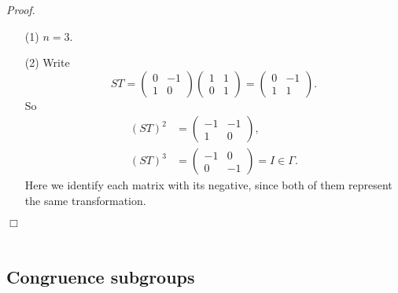 \documentclass{article}
\begin{document}
\emph{Proof.}
\begin{enumerate}
\item[(1)]
  $n = 3$.

\item[(2)]
  Write
  \[
    ST
    =
    \begin{pmatrix}
      0 & -1 \\
      1 & 0
    \end{pmatrix}
    \begin{pmatrix}
      1 & 1 \\
      0 & 1
    \end{pmatrix}
    =
    \begin{pmatrix}
      0 & -1 \\
      1 & 1
    \end{pmatrix}.
  \]
  So
  \begin{align*}
    (ST)^2
    &=
    \begin{pmatrix}
      -1 & -1 \\
      1 & 0
    \end{pmatrix}, \\
    (ST)^3
    &=
    \begin{pmatrix}
      -1 & 0 \\
      0 & -1
    \end{pmatrix} = I \in \Gamma.
  \end{align*}
  Here we identify each matrix with its negative,
  since both of them represent the same transformation.
\end{enumerate}
$\Box$ \\\\






\subsection*{Congruence subgroups \\}
\end{document}
